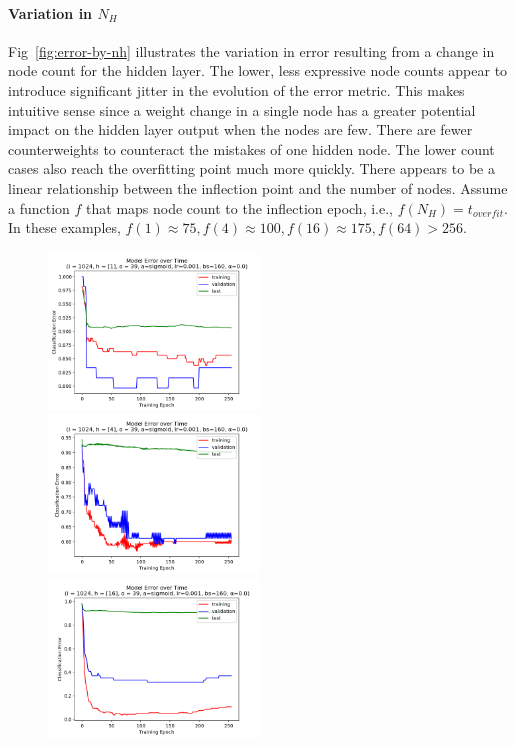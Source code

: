 \documentclass[10pt,epsf]{article}
\begin{document}
{{    \paragraph{Variation in $N_H$}{
      Fig~\ref{fig:error-by-nh} illustrates the variation in error resulting from a change in
      node count for the hidden layer. The lower, less expressive node counts appear to
      introduce significant jitter in the evolution of the error metric. This makes intuitive
      sense since a weight change in a single node has a greater potential impact on the hidden
      layer output when the nodes are few. There are fewer counterweights to counteract the mistakes
      of one hidden node. The lower count cases also reach the overfitting point much more quickly.
      There appears to be a linear relationship between the inflection point and the number of
      nodes. Assume a function $f$ that maps node count to the inflection epoch, i.e.,
      $f(N_H) = t_{overfit}$.
      In these examples, $f(1) \approx 75, f(4) \approx 100, f(16) \approx 175, f(64) > 256$.
    }
    \begin{figure}[H]
      \includegraphics[width=0.5\textwidth]{./img/1-0.001-160-0-sigmoid-1/error-255.png}
      \includegraphics[width=0.5\textwidth]{./img/4-0.001-160-0-sigmoid-1/error-255.png}
      \includegraphics[width=0.5\textwidth]{./img/16-0.001-160-0-sigmoid-1/error-255.png}

\end{figure}}}
\end{document}

